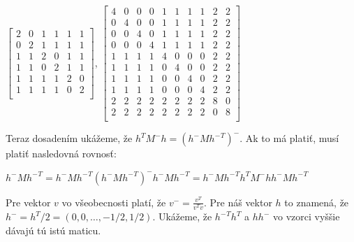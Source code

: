 \begin{dokaz}
\begin{center}
$
\begin{bmatrix}
2 & 0 & 1 & 1 & 1 & 1 \\
0 & 2 & 1 & 1 & 1 & 1 \\
1 & 1 & 2 & 0 & 1 & 1 \\
1 & 1 & 0 & 2 & 1 & 1 \\
1 & 1 & 1 & 1 & 2 & 0 \\
1 & 1 & 1 & 1 & 0 & 2 \\
\end{bmatrix}
$,
$
\begin{bmatrix}
4 & 0 & 0 & 0 & 1 & 1 & 1 & 1 & 2 & 2 \\
0 & 4 & 0 & 0 & 1 & 1 & 1 & 1 & 2 & 2 \\
0 & 0 & 4 & 0 & 1 & 1 & 1 & 1 & 2 & 2 \\
0 & 0 & 0 & 4 & 1 & 1 & 1 & 1 & 2 & 2 \\
1 & 1 & 1 & 1 & 4 & 0 & 0 & 0 & 2 & 2 \\
1 & 1 & 1 & 1 & 0 & 4 & 0 & 0 & 2 & 2 \\
1 & 1 & 1 & 1 & 0 & 0 & 4 & 0 & 2 & 2 \\
1 & 1 & 1 & 1 & 0 & 0 & 0 & 4 & 2 & 2 \\
2 & 2 & 2 & 2 & 2 & 2 & 2 & 2 & 8 & 0 \\
2 & 2 & 2 & 2 & 2 & 2 & 2 & 2 & 0 & 8 \\
\end{bmatrix}
$
\end{center}

Teraz dosadením ukážeme, že $h^T M^- h = (h^- M {h^-}^T)^-$. Ak to má platiť, musí platiť nasledovná rovnosť:

\begin{center}
$
h^- M {h^-}^T = h^- M {h^-}^T (h^- M {h^-}^T)^- h^- M {h^-}^T = h^- M {h^-}^T h^T M^- h h^- M {h^-}^T
$
\end{center}

Pre vektor $v$ vo všeobecnosti platí, že $v^- = \frac{v^T}{v^T v}$. Pre náš vektor $h$ to znamená, že $h^- = h^T/2 = (0, 0, \ldots, -1/2, 1/2)$.
Ukážeme, že ${h^-}^T h^T$ a $h h^-$ vo vzorci vyššie dávajú tú istú maticu.


\end{dokaz}
